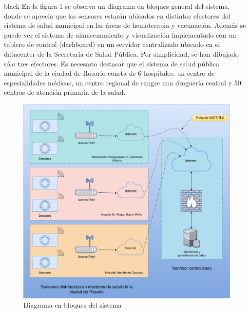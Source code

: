 \documentclass[11pt]{charter}
\begin{document}
\begin{consigna}{black}
En la figura 1 se observa un diagrama en bloques general del sistema, donde se aprecia que los sensores estarán ubicados en distintos efectores del sistema de salud municipal en las áreas de hemoterapia y vacunación. Además se puede ver el sistema de almacenamiento y visualización implementado con un tablero de control  (dashboard) en un servidor centralizado ubicado en el datacenter de la Secretaría de Salud Pública. Por simplicidad, se han dibujado sólo tres efectores. Es necesario destacar que el sistema de salud pública municipal de la ciudad de Rosario consta de 6 hospitales, un centro de especialidades médicas, un centro regional de sangre una droguería central y 50 centros de atención primaria de la salud.
\vspace{25px}

\begin{figure}[htpb]
\centering 
\includegraphics[width=.7\textwidth]{./Figuras/bloquesgral.png}
\caption{Diagrama en bloques del sistema}
\label{fig:diagBloques}
\end{figure}

\vspace{25px}

\end{consigna}
\end{document}

